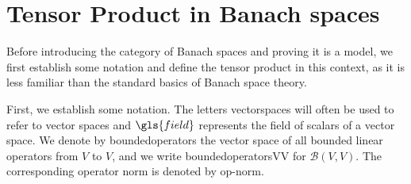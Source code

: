 \section{Tensor Product in Banach spaces}



Before introducing the category of Banach spaces and proving it is a model, we first establish some notation and define the tensor product in this context, as it is less familiar than the standard basics of Banach space theory.

First, we establish some notation. The letters \gls{vectorspaces} will often be used to refer to vector spaces and $\gls{field}$ represents the field of scalars of a vector space.  We denote by \gls{boundedoperators} the vector space of all bounded linear operators from \( V \) to \( V \), and we write  \gls{boundedoperatorsVV} for \( \mathcal{B}(V, V) \). The corresponding operator norm is denoted by \gls{op-norm}.



